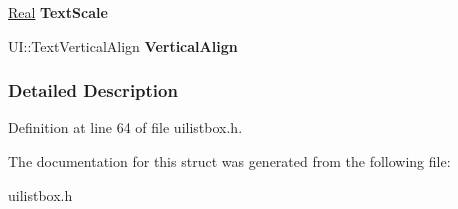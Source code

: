 \begin{DoxyCompactItemize}
\item 
\hypertarget{structphys_1_1UI_1_1ListBox_1_1TemplateParams_a1cfd87311c41d2143b1446621cb68a57}{
\hyperlink{namespacephys_af7eb897198d265b8e868f45240230d5f}{Real} {\bfseries TextScale}}
\label{structphys_1_1UI_1_1ListBox_1_1TemplateParams_a1cfd87311c41d2143b1446621cb68a57}

\item 
\hypertarget{structphys_1_1UI_1_1ListBox_1_1TemplateParams_a9059d03eeca2c88b01651165ab628fb3}{
UI::TextVerticalAlign {\bfseries VerticalAlign}}
\label{structphys_1_1UI_1_1ListBox_1_1TemplateParams_a9059d03eeca2c88b01651165ab628fb3}

\end{DoxyCompactItemize}


\subsubsection{Detailed Description}


Definition at line 64 of file uilistbox.h.



The documentation for this struct was generated from the following file:\begin{DoxyCompactItemize}
\item 
uilistbox.h\end{DoxyCompactItemize}
